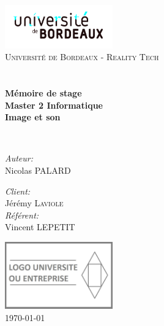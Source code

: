 \begin{titlepage}
\begin{center}

\includegraphics[width=0.35\textwidth]{./logos/ubx}~\\[1cm]

\textsc{\LARGE Université de Bordeaux - Reality Tech}\\[1.5cm]

\textsc{\Large }\\[0.5cm]

\HRule \\[0.4cm]

{\huge \bfseries Mémoire de stage\\
				Master 2 Informatique\\
				Image et son\\}

\HRule \\[1.5cm]

\begin{minipage}{0.4\textwidth}
\begin{flushleft} \large
\emph{Auteur:}\\
Nicolas \textsc{PALARD}\\
\end{flushleft}
\end{minipage}
\begin{minipage}{0.4\textwidth}
\begin{flushright} \large
\emph{Client:} \\
Jérémy \textsc{Laviole}\\
\emph{Référent:} \\
Vincent \textsc{LEPETIT}
\end{flushright}
\end{minipage}

\vfill

\includegraphics[width=0.35\textwidth]{./logos/placeholder}~\\[1cm]
{\large \today}

\end{center}
\end{titlepage}